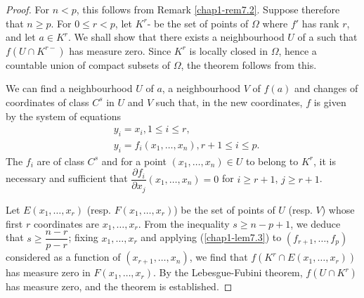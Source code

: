 \begin{proof}
For $n<p$, this follows from Remark \ref{chap1-rem7.2}. Suppose therefore that $n\geq p$. For $0\leq r<p$, let $K^{r}$- be the set of points of $\Omega$ where $f'$ has rank $r$, and let $a\in K^{r}$. We shall show that there exists a neighbourhood $U$ of a such that $f(U\cap K^{r-})$ has measure zero. Since $K^{r}$ is locally closed in $\Omega$, hence a countable union of compact subsets of $\Omega$, the theorem follows from this.

We can find a neighbourhood $U$ of $a$, a neighbourhood $V$ of $f(a)$ and changes of coordinates of class $C^{s}$ in $U$ and $V$ such that, in the new coordinates, $f$ is given by the system of equations
\begin{align*}
& y_{i}=x_{i}, 1\leq i\leq r,\\
& y_{i}=f_{i}(x_{1},\ldots,x_{n}),r+1\leq i\leq p.
\end{align*}
The $f_{i}$ are of class $C^{s}$ and for a point $(x_{1},\ldots,x_{n})\in U$ to belong to $K^{r}$, it is necessary and sufficient that $\dfrac{\partial f_{i}}{\partial x_{j}}(x_{1},\ldots,x_{n})=0$ for $i\geq r+1$, $j\geq r+1$.

Let $E(x_{1},\ldots,x_{r})$ (resp. $F(x_{1},\ldots,x_{r})$) be the set of points of $U$ (resp. $V$) whose first $r$ coordinates are $x_{1},\ldots,x_{r}$. From the inequality $s\geq n-p+1$, we deduce that $s\geq \dfrac{n-r}{p-r}$; fixing $x_{1},\ldots,x_{r}$ and applying (\ref{chap1-lem7.3}) to $(f_{r+1},\ldots,f_{p})$ considered as a function of $(x_{r+1},\ldots,x_{n})$, we find that $f(K^{r}\cap E(x_{1},\ldots,x_{r}))$ has measure zero in $F(x_{1},\ldots,x_{r})$. By the Lebesgue-Fubini theorem, $f(U\cap K^{r})$ has measure zero, and the theorem is established.
\end{proof}

